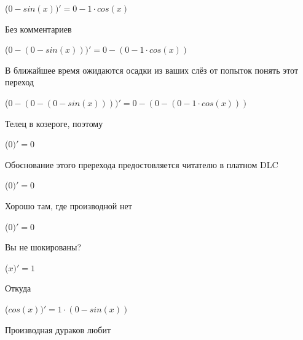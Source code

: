 \documentclass[12pt,a4paper,fleqn]{article}
\begin{document}
\begin{center}
\begin{center}
\begin{center}
\begin{center}
\begin{center}
\begin{center}
\begin{center}
\begin{center}
\begin{center}
\begin{center}
\begin{center}
\begin{center}
\begin{center}
\begin{center}
\begin{center}
\begin{center}
\begin{center}
\begin{center}
\begin{center}
\begin{center}
\begin{center}
\begin{center}
\begin{center}
\begin{center}
\begin{center}
\begin{center}
\begin{center}
\begin{center}
\begin{center}
\begin{center}
\begin{center}
\begin{center}
\begin{center}
\begin{center}
\begin{center}
\begin{center}
\begin{center}
\begin{center}
\begin{center}
\begin{center}
\begin{center}
\begin{center}
\begin{center}
\begin{center}
\begin{center}
\begin{center}
\begin{center}
\begin{center}
\begin{center}
\begin{center}
\begin{center}
\begin{center}
\begin{center}
\begin{center}
\begin{center}
\begin{center}
 ($0-sin(x))'
  = 0-1 \cdot cos(x)$\end{center}
Без комментариев\cite{link4}

\begin{center}
 ($0-(0-sin(x)))'
  = 0-(0-1 \cdot cos(x))$\end{center}
В ближайшее время ожидаются осадки из ваших слёз от попыток понять этот переход

\begin{center}
 ($0-(0-(0-sin(x))))'
  = 0-(0-(0-1 \cdot cos(x)))$\end{center}
Телец в козероге, поэтому

\begin{center}
 ($0)'
  = 0$\end{center}
Обоснование этого пререхода предостовляется читателю в платном DLC

\begin{center}
 ($0)'
  = 0$\end{center}
Хорошо там, где производной нет\cite{link2}

\begin{center}
 ($0)'
  = 0$\end{center}
Вы не шокированы?\cite{link3}

\begin{center}
 ($x)'
  = 1$\end{center}
Откуда

\begin{center}
 ($cos(x))'
  = 1 \cdot (0-sin(x))$\end{center}
Производная дураков любит\cite{link2}


\end{center}
\end{center}
\end{center}
\end{center}
\end{center}
\end{center}
\end{center}
\end{center}
\end{center}
\end{center}
\end{center}
\end{center}
\end{center}
\end{center}
\end{center}
\end{center}
\end{center}
\end{center}
\end{center}
\end{center}
\end{center}
\end{center}
\end{center}
\end{center}
\end{center}
\end{center}
\end{center}
\end{center}
\end{center}
\end{center}
\end{center}
\end{center}
\end{center}
\end{center}
\end{center}
\end{center}
\end{center}
\end{center}
\end{center}
\end{center}
\end{center}
\end{center}
\end{center}
\end{center}
\end{center}
\end{center}
\end{center}
\end{center}
\end{center}
\end{center}
\end{center}
\end{center}
\end{center}
\end{center}
\end{center}
\end{document}
